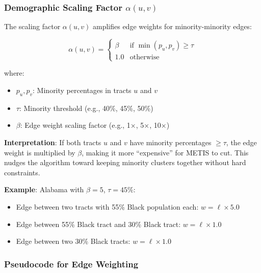 \subsubsection{Demographic Scaling Factor $\alpha(u,v)$}

The scaling factor $\alpha(u,v)$ amplifies edge weights for minority-minority edges:

\[
\alpha(u,v) =
\begin{cases}
\beta & \text{if } \min(p_u, p_v) \geq \tau \\
1.0 & \text{otherwise}
\end{cases}
\]

where:
\begin{itemize}
    \item $p_u, p_v$: Minority percentages in tracts $u$ and $v$
    \item $\tau$: Minority threshold (e.g., 40\%, 45\%, 50\%)
    \item $\beta$: Edge weight scaling factor (e.g., 1×, 5×, 10×)
\end{itemize}

\textbf{Interpretation}: If both tracts $u$ and $v$ have minority percentages $\geq \tau$, the edge weight is multiplied by $\beta$, making it more ``expensive'' for METIS to cut. This nudges the algorithm toward keeping minority clusters together without hard constraints.

\textbf{Example}: Alabama with $\beta = 5$, $\tau = 45\%$:
\begin{itemize}
    \item Edge between two tracts with 55\% Black population each: $w = \ell \times 5.0$
    \item Edge between 55\% Black tract and 30\% Black tract: $w = \ell \times 1.0$
    \item Edge between two 30\% Black tracts: $w = \ell \times 1.0$
\end{itemize}

\subsubsection{Pseudocode for Edge Weighting}

